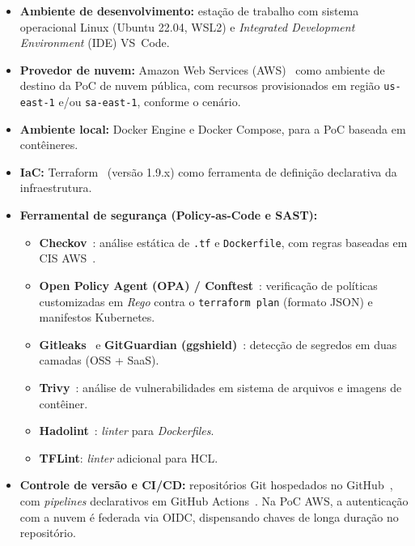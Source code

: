 \begin{itemize}
    \item \textbf{Ambiente de desenvolvimento:} estação de trabalho com sistema operacional Linux (Ubuntu 22.04, WSL2) e \textit{Integrated Development Environment} (IDE) VS~Code.
    \item \textbf{Provedor de nuvem:} Amazon Web Services (AWS)~ como ambiente de destino da PoC de nuvem pública, com recursos provisionados em região \texttt{us-east-1} e/ou \texttt{sa-east-1}, conforme o cenário.
    \item \textbf{Ambiente local:} Docker Engine e Docker Compose, para a PoC baseada em contêineres.
    \item \textbf{IaC:} Terraform~ (versão 1.9.x) como ferramenta de definição declarativa da infraestrutura.
    \item \textbf{Ferramental de segurança (Policy-as-Code e SAST):}
    \begin{itemize}
        \item \textbf{Checkov}~: análise estática de \texttt{.tf} e \texttt{Dockerfile}, com regras baseadas em CIS AWS~.
        \item \textbf{Open Policy Agent (OPA) / Conftest}~: verificação de políticas customizadas em \textit{Rego} contra o \texttt{terraform plan} (formato JSON) e manifestos Kubernetes.
        \item \textbf{Gitleaks}~ e \textbf{GitGuardian (ggshield)}~: detecção de segredos em duas camadas (OSS + SaaS).
        \item \textbf{Trivy}~: análise de vulnerabilidades em sistema de arquivos e imagens de contêiner.
        \item \textbf{Hadolint}~: \textit{linter} para \textit{Dockerfiles}.
        \item \textbf{TFLint}: \textit{linter} adicional para HCL.
    \end{itemize}
    \item \textbf{Controle de versão e CI/CD:} repositórios Git hospedados no GitHub~, com \textit{pipelines} declarativos em GitHub Actions~. Na PoC AWS, a autenticação com a nuvem é federada via OIDC, dispensando chaves de longa duração no repositório.
\end{itemize}


